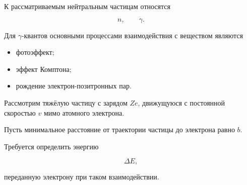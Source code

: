 \documentclass[../final.tex]{subfiles}
\begin{document}
К рассматриваемым нейтральным частицам относятся

\begin{equation*}
    n,
    \qquad
    \gamma.
\end{equation*}

Для $\gamma$-квантов основными процессами взаимодействия
с веществом являются

\begin{itemize}
    \item фотоэффект;
    \item эффект Комптона;
    \item рождение электрон-позитронных пар.
\end{itemize}






\condition

Рассмотрим тяжёлую частицу с зарядом $Ze$,
движущуюся с постоянной скоростью $v$ мимо атомного электрона.

Пусть минимальное расстояние от траектории частицы
до электрона равно $b$.

Требуется определить энергию

\begin{equation*}
    \Delta E,
\end{equation*}

переданную электрону при таком взаимодействии.
\end{document}
